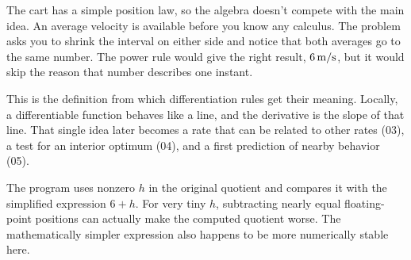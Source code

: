 The cart has a simple position law, so the algebra doesn't compete with the main idea. An average velocity is available before you know any calculus. The problem asks you to shrink the interval on either side and notice that both averages go to the same number. The power rule would give the right result, \(6\,\mathrm{m/s}\), but it would skip the reason that number describes one instant.

This is the definition from which differentiation rules get their meaning. Locally, a differentiable function behaves like a line, and the derivative is the slope of that line. That single idea later becomes a rate that can be related to other rates (03), a test for an interior optimum (04), and a first prediction of nearby behavior (05).

The program uses nonzero \(h\) in the original quotient and compares it with the simplified expression \(6+h\). For very tiny \(h\), subtracting nearly equal floating-point positions can actually make the computed quotient worse. The mathematically simpler expression also happens to be more numerically stable here.


